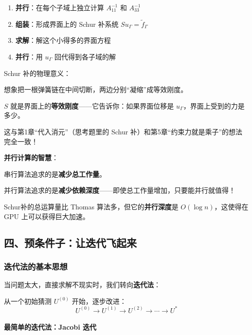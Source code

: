 \begin{keyformula}[title=Schur 补方法]
\begin{enumerate}
    \item \textbf{并行}：在每个子域上独立计算 $A_{11}^{-1}$ 和 $A_{33}^{-1}$
    \item \textbf{组装}：形成界面上的 Schur 补系统 $S u_\Gamma = \tilde{f}_\Gamma$
    \item \textbf{求解}：解这个小得多的界面方程
    \item \textbf{并行}：用 $u_\Gamma$ 回代得到各子域的解
\end{enumerate}
\end{keyformula}

\begin{physicalmeaning}
Schur 补的物理意义：

想象把一根弹簧链在中间切断，两边分别“凝缩”成等效刚度。

$S$ 就是界面上的\textbf{等效刚度}——它告诉你：如果界面位移是 $u_\Gamma$，界面上受到的力是多少。

这与第1章“代入消元”（思考题里的 Schur 补）和第5章“约束力就是乘子”的想法完全一致！
\end{physicalmeaning}


\begin{insightbox}
\textbf{并行计算的智慧}：

串行算法追求的是\textbf{减少总工作量}。

并行算法追求的是\textbf{减少依赖深度}——即使总工作量增加，只要能并行就值得！

Schur补的总运算量比 Thomas 算法多，但它的\textbf{并行深度}是 $O(\log n)$，这使得在 GPU 上可以获得巨大加速。
\end{insightbox}

\subsection*{四、预条件子：让迭代飞起来}

\subsubsection*{迭代法的基本思想}

当问题太大，直接求解不现实时，我们转向\textbf{迭代法}：

从一个初始猜测 $U^{(0)}$ 开始，逐步改进：
\[
U^{(0)} \to U^{(1)} \to U^{(2)} \to \cdots \to U^*
\]

\paragraph{最简单的迭代法：Jacobi 迭代}

